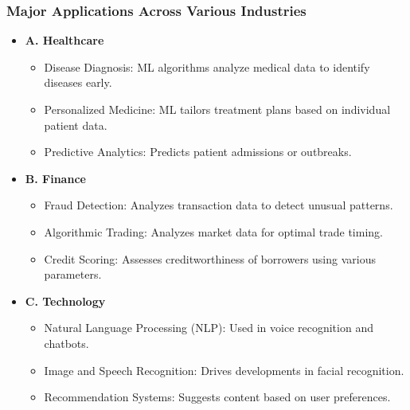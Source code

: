 \documentclass[aspectratio=169]{beamer}
\begin{document}
\begin{frame}[fragile]
    \frametitle{Major Applications Across Various Industries}
    \begin{itemize}
        \item \textbf{A. Healthcare}
        \begin{itemize}
            \item Disease Diagnosis: ML algorithms analyze medical data to identify diseases early.
            \item Personalized Medicine: ML tailors treatment plans based on individual patient data.
            \item Predictive Analytics: Predicts patient admissions or outbreaks.
        \end{itemize}
        
        \item \textbf{B. Finance}
        \begin{itemize}
            \item Fraud Detection: Analyzes transaction data to detect unusual patterns.
            \item Algorithmic Trading: Analyzes market data for optimal trade timing.
            \item Credit Scoring: Assesses creditworthiness of borrowers using various parameters.
        \end{itemize}
        
        \item \textbf{C. Technology}
        \begin{itemize}
            \item Natural Language Processing (NLP): Used in voice recognition and chatbots.
            \item Image and Speech Recognition: Drives developments in facial recognition.
            \item Recommendation Systems: Suggests content based on user preferences.
        \end{itemize}
    \end{itemize}
\end{frame}
\end{document}
